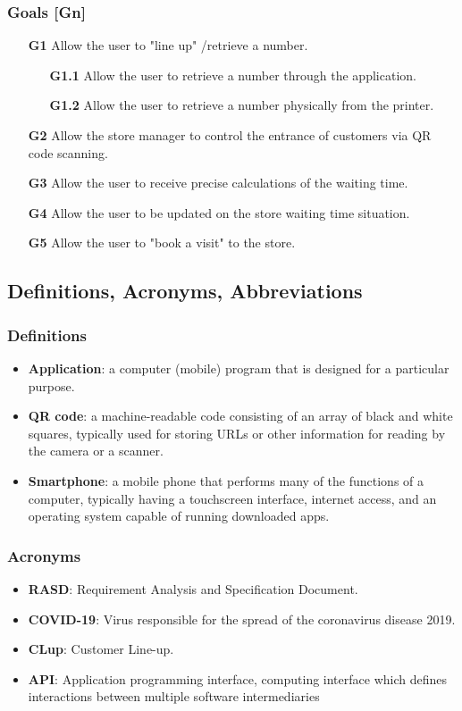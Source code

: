 \subsubsection{Goals [Gn]}
\hspace{\parindent}\begin{itemize}
	\item[\textbf{G1}]Allow the user to "line up" /retrieve a number.
	\begin{itemize}
		\item[\textbf{G1.1}]Allow the user to retrieve a number through the application.
		\item[\textbf{G1.2}]Allow the user to retrieve a number physically from the printer. 
	\end{itemize}
	\item[\textbf{G2}]Allow the store manager to control the entrance of customers via QR code scanning. 
	\item[\textbf{G3}]Allow the user to receive precise calculations of the waiting time. 
	\item[\textbf{G4}]Allow the user to be updated on the store waiting time situation.
	\item[\textbf{G5}]Allow the user to "book a visit" to the store.
\end{itemize}

\newpage
\subsection{Definitions, Acronyms, Abbreviations}
\subsubsection{Definitions}
\begin{itemize}
	\item \textbf{Application}: a computer (mobile) program that is designed for a particular purpose. 
	\item \textbf{QR code}: a machine-readable code consisting of an array of black and white squares, typically used for storing URLs or other information for reading by the camera or a scanner. 
	\item \textbf{Smartphone}: a mobile phone that performs many of the functions of a computer, typically having a touchscreen interface, internet access, and an operating system capable of running downloaded apps. 
\end{itemize}
\subsubsection{Acronyms}
\begin{itemize}
	\item \textbf{RASD}: Requirement Analysis and Specification Document. 
	\item \textbf{COVID-19}: Virus responsible for the spread of the coronavirus disease 2019. 
	\item \textbf{CLup}: Customer Line-up. 
	\item \textbf{API}: Application programming interface, computing interface which defines interactions between multiple software intermediaries 
\end{itemize}
